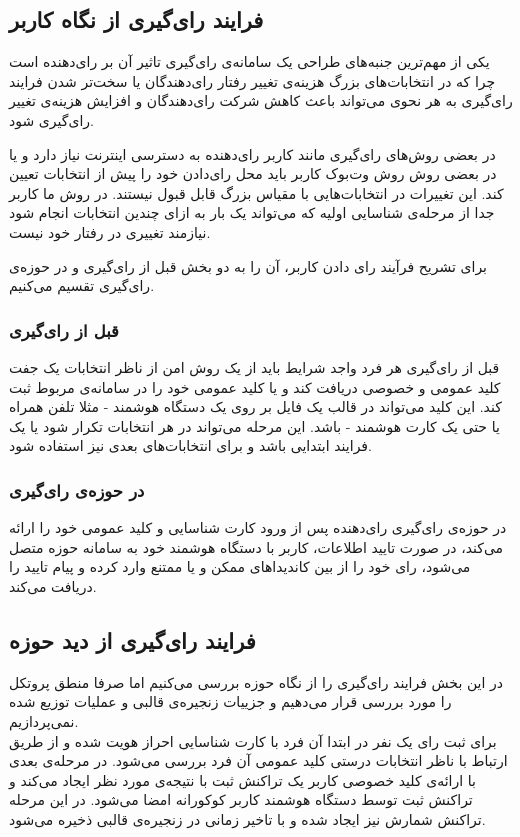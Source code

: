 \subsection{فرایند رای‌گیری از نگاه کاربر}
یکی از مهم‌ترین جنبه‌های طراحی یک سامانه‌ی رای‌گیری تاثیر آن بر رای‌دهنده است چرا که در انتخابات‌های بزرگ هزینه‌ی تغییر رفتار رای‌دهندگان یا سخت‌تر شدن فرایند رای‌گیری به هر نحوی می‌تواند باعث کاهش شرکت رای‌دهندگان و افزایش هزینه‌ی تغییر رای‌گیری شود.
\par
در بعضی روش‌های رای‌گیری مانند  کاربر رای‌دهنده به دسترسی اینترنت نیاز دارد و یا در بعضی روش‌ روش وت‌بوک کاربر باید محل رای‌دادن خود را پیش از انتخابات تعیین کند. این تغییرات در انتخابات‌هایی با مقیاس بزرگ قابل قبول نیستند. در روش ما کاربر جدا از مرحله‌ی شناسایی اولیه که می‌تواند یک بار به ازای چندین انتخابات انجام شود نیازمند تغییری در رفتار خود نیست. 
\par
برای تشریح فرآیند رای‌ دادن کاربر، آن را به دو بخش قبل از رای‌گیری و در حوزه‌ی رای‌گیری تقسیم می‌کنیم. 
\subsubsection{قبل از رای‌گیری}
قبل از رای‌گیری هر فرد واجد شرایط باید از یک روش امن از ناظر انتخابات یک جفت کلید عمومی و خصوصی دریافت کند و یا کلید عمومی خود را در سامانه‌ی مربوط ثبت کند. این کلید می‌تواند در قالب یک فایل بر روی یک دستگاه هوشمند - مثلا تلفن همراه یا حتی یک کارت هوشمند - باشد. این مرحله  می‌تواند در هر انتخابات تکرار شود یا یک فرایند ابتدایی باشد و برای انتخابات‌های بعدی نیز استفاده شود. 
\subsubsection{در حوزه‌ی رای‌گیری}
در حوزه‌ی رای‌گیری رای‌دهنده پس از ورود کارت شناسایی و کلید عمومی خود را ارائه می‌کند، در صورت تایید اطلاعات، کاربر با دستگاه هوشمند خود به سامانه‌ حوزه متصل می‌شود، رای‌ خود را از بین‌ کاندیدا‌های ممکن و یا ممتنع وارد کرده و پیام تایید را دریافت می‌کند. 
\subsection{فرایند رای‌گیری از دید حوزه‌}
در این بخش فرایند رای‌گیری را از نگاه حوزه‌ بررسی می‌کنیم اما صرفا منطق پروتکل را مورد بررسی قرار می‌دهیم و جزییات زنجیره‌ی قالبی و عملیات توزیع شده نمی‌پردازیم. 
\\
برای ثبت رای یک‌ نفر در ابتدا آن فرد با کارت شناسایی احراز هویت شده و از طریق ارتباط با ناظر انتخابات درستی کلید عمومی آن فرد بررسی می‌شود. در مرحله‌ی بعدی با ارائه‌ی کلید خصوصی کاربر یک تراکنش ثبت با نتیجه‌ی مورد نظر ایجاد می‌کند و تراکنش ثبت توسط دستگاه هوشمند کاربر کوکورانه امضا می‌شود. در این مرحله تراکنش شمارش نیز ایجاد شده و با تاخیر زمانی در زنجیره‌ی قالبی ذخیره می‌شود.

